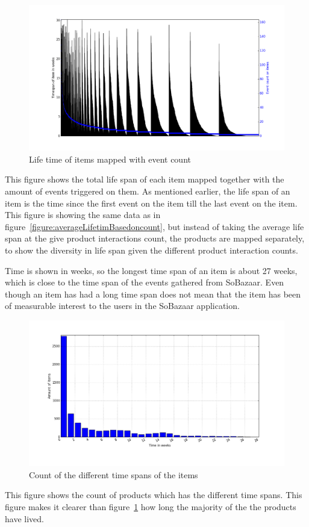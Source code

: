     \begin{figure}[H]
        \includegraphics[width=5in]{image/itemTimeSpansortedoneventcount.png}
        \centering
        \caption{Life time of items mapped with event count}
    \label{figure:itemTimeSpanEventCount}
    \end{figure}
        This figure shows the total life span of each item mapped together with the amount of events triggered on them.
        As mentioned earlier, the life span of an item is the time since the first event on the item till the last event on the item.
        This figure is showing the same data as in figure~\ref{figure:averageLifetimBasedoncount}, but instead of taking the average life span at the give product interactions count, the products are mapped separately, to show the diversity in life span given the different product interaction counts.

        Time is shown in weeks, so the longest time span of an item is about 27 weeks, which is close to the time span of the events gathered from SoBazaar.
        Even though an item has had a long time span does not mean that the item has been of measurable interest to the users in the SoBazaar application.

    \begin{figure}[H]
        \includegraphics[width=5in]{image/itemTimespansdistribution.png}
        \centering
        \caption{Count of the different time spans of the items}
    \label{figure:itemLifes}
    \end{figure}
        This figure shows the count of products which has the different time spans.
        This figure makes it clearer than figure~\ref{figure:itemTimeSpanEventCount} how long the majority of the the products have lived.

